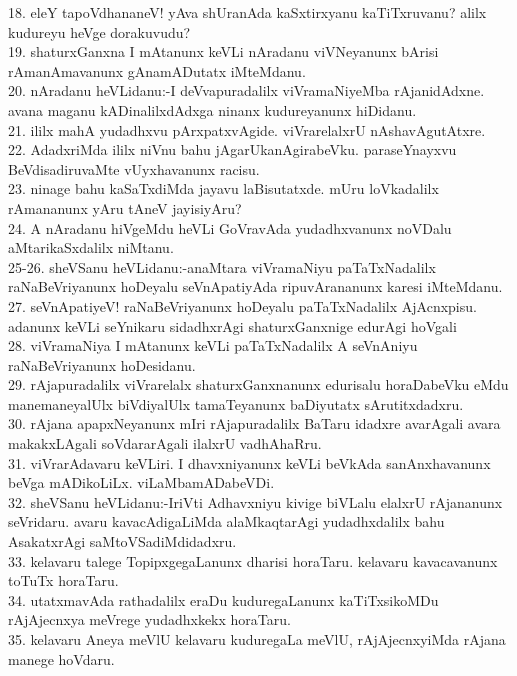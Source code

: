 \documentclass{article}
\begin{document}
18. eleY tapoVdhananeV! yAva shUranAda kaSxtirxyanu kaTiTxruvanu? alilx kudureyu heVge dorakuvudu?\\
19. shaturxGanxna I mAtanunx keVLi nAradanu viVNeyanunx bArisi rAmanAmavanunx gAnamADutatx iMteMdanu.\\
20. nAradanu heVLidanu:-I deVvapuradalilx viVramaNiyeMba rAjanidAdxne. avana maganu kADinalilxdAdxga ninanx kudureyanunx hiDidanu.\\
21. ililx mahA yudadhxvu pArxpatxvAgide. viVrarelalxrU nAshavAgutAtxre.\\
22. AdadxriMda ililx niVnu bahu jAgarUkanAgirabeVku. paraseYnayxvu BeVdisadiruvaMte vUyxhavanunx racisu.\\
23. ninage bahu kaSaTxdiMda jayavu laBisutatxde. mUru loVkadalilx rAmananunx yAru tAneV jayisiyAru?\\
24. A nAradanu hiVgeMdu heVLi GoVravAda yudadhxvanunx noVDalu aMtarikaSxdalilx niMtanu.\\
25-26. sheVSanu heVLidanu:-anaMtara viVramaNiyu paTaTxNadalilx raNaBeVriyanunx hoDeyalu seVnApatiyAda ripuvArananunx karesi iMteMdanu.\\
27. seVnApatiyeV! raNaBeVriyanunx hoDeyalu paTaTxNadalilx AjAcnxpisu. adanunx keVLi seYnikaru sidadhxrAgi shaturxGanxnige edurAgi hoVgali\\
28. viVramaNiya I mAtanunx keVLi paTaTxNadalilx A seVnAniyu raNaBeVriyanunx hoDesidanu.\\
29. rAjapuradalilx viVrarelalx shaturxGanxnanunx edurisalu horaDabeVku eMdu manemaneyalUlx biVdiyalUlx tamaTeyanunx baDiyutatx sArutitxdadxru.\\
30. rAjana apapxNeyanunx mIri rAjapuradalilx BaTaru idadxre avarAgali avara makakxLAgali soVdararAgali ilalxrU vadhAhaRru.\\
31. viVrarAdavaru keVLiri. I dhavxniyanunx keVLi beVkAda sanAnxhavanunx beVga mADikoLiLx. viLaMbamADabeVDi.\\
32. sheVSanu heVLidanu:-IriVti Adhavxniyu kivige biVLalu elalxrU rAjananunx seVridaru. avaru kavacAdigaLiMda alaMkaqtarAgi yudadhxdalilx bahu AsakatxrAgi saMtoVSadiMdidadxru.\\
33. kelavaru talege TopipxgegaLanunx dharisi horaTaru. kelavaru kavacavanunx toTuTx horaTaru.\\
34. utatxmavAda rathadalilx eraDu kuduregaLanunx kaTiTxsikoMDu rAjAjecnxya meVrege yudadhxkekx horaTaru.\\
35. kelavaru Aneya meVlU kelavaru kuduregaLa meVlU, rAjAjecnxyiMda rAjana manege hoVdaru.\\
\end{document}
